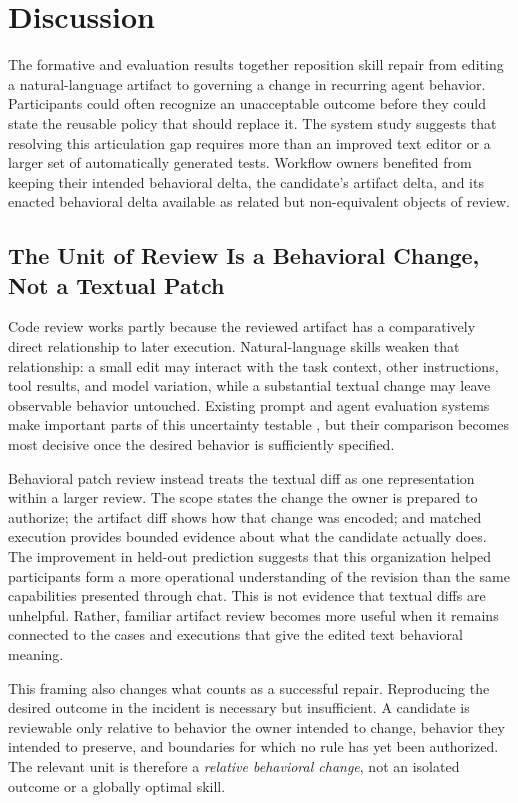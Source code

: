 \section{Discussion}
\label{sec:discussion}

The formative and evaluation results together reposition skill repair from
editing a natural-language artifact to governing a change in recurring agent
behavior. Participants could often recognize an unacceptable outcome before
they could state the reusable policy that should replace it. The system study
suggests that resolving this articulation gap requires more than an improved
text editor or a larger set of automatically generated tests. Workflow owners
benefited from keeping their intended behavioral delta, the candidate's
artifact delta, and its enacted behavioral delta available as related but
non-equivalent objects of review.

\subsection{The Unit of Review Is a Behavioral Change, Not a Textual Patch}

Code review works partly because the reviewed artifact has a comparatively
direct relationship to later execution. Natural-language skills weaken that
relationship: a small edit may interact with the task context, other
instructions, tool results, and model variation, while a substantial textual
change may leave observable behavior untouched. Existing prompt and agent
evaluation systems make important parts of this uncertainty testable
\cite{arawjo2024chainforge,kim2024evallm,sharma2025promptpex}, but their
comparison becomes most decisive once the desired behavior is sufficiently
specified.

Behavioral patch review instead treats the textual diff as one representation
within a larger review. The scope states the change the owner is prepared to
authorize; the artifact diff shows how that change was encoded; and matched
execution provides bounded evidence about what the candidate actually does.
The improvement in held-out prediction suggests that this organization helped
participants form a more operational understanding of the revision than the
same capabilities presented through chat. This is not evidence that textual
diffs are unhelpful. Rather, familiar artifact review becomes more useful when
it remains connected to the cases and executions that give the edited text
behavioral meaning.

This framing also changes what counts as a successful repair. Reproducing the
desired outcome in the incident is necessary but insufficient. A candidate is
reviewable only relative to behavior the owner intended to change, behavior
they intended to preserve, and boundaries for which no rule has yet been
authorized. The relevant unit is therefore a \emph{relative behavioral
change}, not an isolated outcome or a globally optimal skill.

